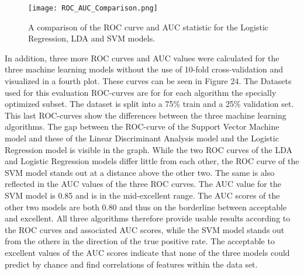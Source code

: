 \documentclass[../masterarbeit.tex]{subfiles}
\begin{document}
\begin{figure}[h]
    \centering
    \texttt{[image: ROC\_AUC\_Comparison.png]}
    \caption{A comparison of the ROC curve and AUC statistic for the Logistic Regression, LDA and SVM models.}
\end{figure}
In addition, three more ROC curves and AUC values were calculated for the three machine learning models without the use of 10-fold cross-validation and visualized in a fourth plot. These curves can be seen in Figure 24. The Datasets used for this evaluation ROC-curves are for for each algorithm the specially optimized subset. The dataset is split into a 75\% train and a 25\% validation set. This last ROC-curves show the differences between the three machine learning algorithms. The gap between the ROC-curve of the Support Vector Machine model and these of the Linear Discriminant Analysis model and the Logistic Regression model is visible in the graph. While the two ROC curves of the LDA and Logistic Regression models differ little from each other, the ROC curve of the SVM model stands out at a distance above the other two. The same is also reflected in the AUC values of the three ROC curves. The AUC value for the SVM model is 0.85 and is in the mid-excellent range. The AUC scores of the other two models are both 0.80 and thus on the borderline between acceptable and excellent. All three algorithms therefore provide usable results according to the ROC curves and associated AUC scores, while the SVM model stands out from the others in the direction of the true positive rate. The acceptable to excellent values of the AUC scores indicate that none of the three models could predict by chance and find correlations of features within the data set.
\end{document}
